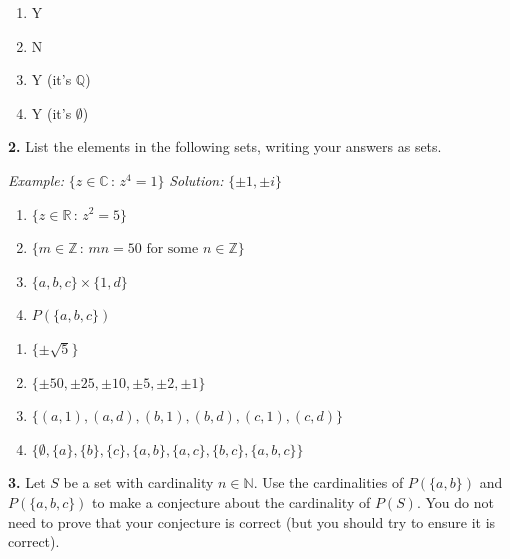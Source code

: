 \documentclass[10pt,]{book}
\theoremstyle{plain}
\theoremstyle{definition}
\theoremstyle{definition}
\theoremstyle{definition}
\theoremstyle{definition}
\numberwithin{equation}{section}
\def\Z{\mathbb{Z}}
\def\R{\mathbb{R}}
\def\Q{\mathbb{Q}}
\def\C{\mathbb{C}}
\def\N{\mathbb{N}}
\begin{document}
\par\smallskip
\leavevmode%
\begin{multicols}{4}
\begin{enumerate}[label=(\alph*)]
\item\hypertarget{li-27}{}Y%
\item\hypertarget{li-28}{}N%
\item\hypertarget{li-29}{}Y (it's \(\Q\))%
\item\hypertarget{li-30}{}Y (it's \(\emptyset\)) %
\end{enumerate}
\end{multicols}
\par\smallskip
\noindent\textbf{2.}\quad{}
        List the elements in the following sets, writing your answers as sets.
\par

        \emph{Example:} \(\{z\in \C\,:\,z^4=1\}\) \emph{Solution:} \(\{\pm 1, \pm i\}\)
        \leavevmode%
\begin{enumerate}[label=(\alph*)]
\item\hypertarget{li-31}{}
              \(\{z\in \R\,:\, z^2=5\}\)
\item\hypertarget{li-32}{}
              \(\{m \in \Z\,:\, mn=50 \mbox{ for some } n\in \Z\}\)
\item\hypertarget{li-33}{}
              \(\{a,b,c\}\times \{1,d\}\)
\item\hypertarget{li-34}{}
              \(P(\{a,b,c\})\)
\end{enumerate}

\par\smallskip
\leavevmode%
\begin{enumerate}[label=(\alph*)]
\item\hypertarget{li-35}{}
          \(\{\pm\sqrt{5}\}\)
\item\hypertarget{li-36}{}
          \(\{\pm 50, \pm 25, \pm 10, \pm 5, \pm 2, \pm 1\}\)
\item\hypertarget{li-37}{}
          \(\{(a,1),(a,d), (b,1),(b,d),(c,1),(c,d)\}\)
\item\hypertarget{li-38}{}
          \(\{\emptyset, \{a\}, \{b\},
          \{c\},\{a,b\},\{a,c\},\{b,c\}, \{a,b,c\}\}\)
\end{enumerate}
\par\smallskip
\noindent\textbf{3.}\quad{}
        Let \(S\) be a set with cardinality \(n\in \N\). Use the cardinalities of \(P(\{a,b\})\) and \(P(\{a,b,c\})\) to make a conjecture about the cardinality of \(P(S)\). You do not need to prove that your conjecture is correct (but you should try to ensure it is correct).
\par\smallskip
\end{document}
